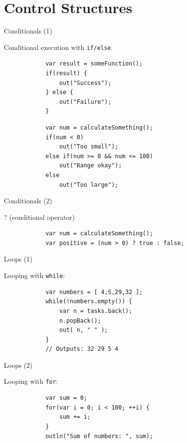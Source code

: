 \documentclass[ucs,9pt]{beamer}
\begin{document}
\section{Control Structures}
\begin{frame}[fragile]{Conditionals (1)}
	\begin{block}{Conditional execution with \lstinline!if/else!.}
		\begin{lstlisting}
			var result = someFunction();
			if(result) {
			    out("Success");
			} else {
			    out("Failure");
			}
		\end{lstlisting}
		\begin{lstlisting}
			var num = calculateSomething();
			if(num < 0) 
			    out("Too small");
			else if(num >= 0 && num <= 100)
			    out("Range okay");
			else
			    out("Too large");
		\end{lstlisting}
	\end{block}
\end{frame}

\begin{frame}[fragile]{Conditionals (2)}
	\begin{block}{? (conditional operator)}
		\begin{lstlisting}
			var num = calculateSomething();
			var positive = (num > 0) ? true : false;
		\end{lstlisting}
	\end{block}
\end{frame}

\begin{frame}[fragile]{Loops (1)}
	\begin{block}{Looping with \lstinline!while!:}
		\begin{lstlisting}
			var numbers = [ 4,5,29,32 ];
			while(!numbers.empty()) {
			    var n = tasks.back();
			    n.popBack();
			    out( n, " " );
			}
			// Outputs: 32 29 5 4
		\end{lstlisting}
	\end{block}
\end{frame}

\begin{frame}[fragile]{Loops (2)}
	\begin{block}{Looping with \lstinline!for!:}
		\begin{lstlisting}
			var sum = 0;
			for(var i = 0; i < 100; ++i) {
			    sum += i;
			}
			outln("Sum of numbers: ", sum);
		\end{lstlisting}
	\end{block}
\end{frame}
\end{document}
